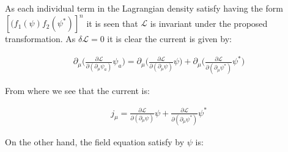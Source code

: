 As each individual term in the Lagrangian density satisfy having the form $[(f_1(\psi)f_2(\psi^{*})]^n$ it is seen that $\mathcal{L}$ is invariant under the proposed transformation. As $\delta\mathcal{L} = 0$ it is clear the current is given by:


\begin{equation}
\begin{aligned}
\partial_{\mu} \Bigg(\frac{\partial\mathcal{L}}{\partial (\partial_{\mu} \psi_a)} \psi_a \Bigg) = \partial_{\mu}\Bigg(\frac{\partial\mathcal{L}}{\partial (\partial_{\mu} \psi)} \psi \Bigg) + \partial_{\mu}\Bigg(\frac{\partial\mathcal{L}}{\partial (\partial_{\mu} \psi^{*})} \psi^{*} \Bigg) 
\label{eq1:ex3_step4}
\end{aligned}
\end{equation}

From where we see that the current is:

\begin{equation}
\begin{aligned}
j_{\mu} = \frac{\partial\mathcal{L}}{\partial (\partial_{\mu} \psi)} \psi + \frac{\partial\mathcal{L}}{\partial (\partial_{\mu} \psi ^{*})} \psi^{*} 
\label{eq1:ex3_step4}
\end{aligned}
\end{equation}

On the other hand, the field equation satisfy by $\psi$ is:



